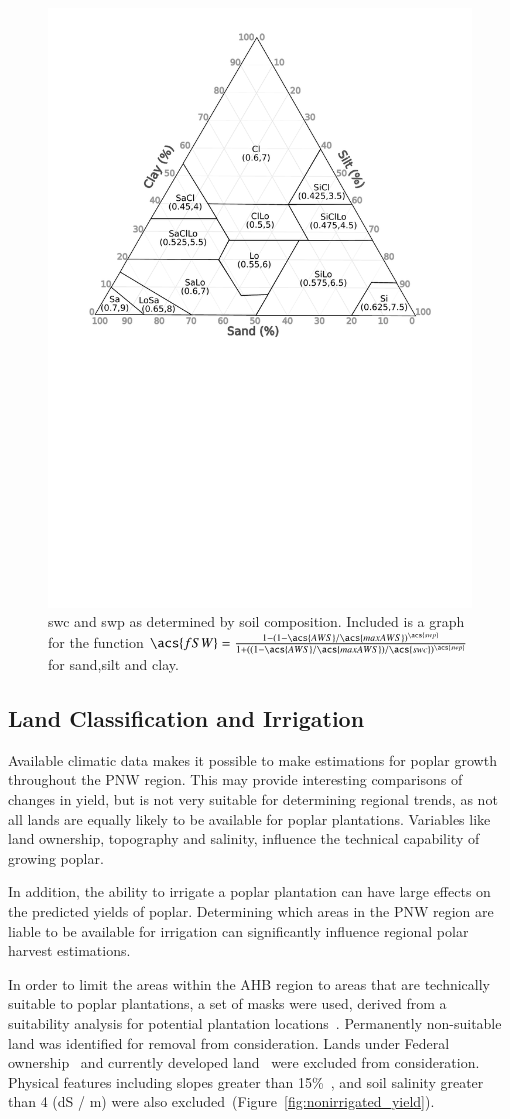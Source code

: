 \documentclass[preprint,12pt]{elsarticle}
\begin{document}
\begin{figure}
  \centering
  \includegraphics[width=0.45\linewidth]{soil_triangle}
  
  \caption{\acs{swc} and \acs{swp} as determined by soil composition.  Included is a graph for the function $\acs{fSW} = \frac{1-(1-\acs{AWS}/\acs{maxAWS})^{\acs{swp}}}{1+((1-\acs{AWS}/\acs{maxAWS})/\acs{swc})^{\acs{swp}}}$ for sand,silt and clay. }
  \label{fig:soil-triangle}
\end{figure}

\subsection{Land Classification and Irrigation}
\label{sec:land}

Available climatic data makes it possible to make estimations for
poplar growth throughout the \ac{PNW} region.  This may provide
interesting comparisons of changes in yield, but is not very suitable
for determining regional trends, as not all lands are equally likely
to be available for poplar plantations.  Variables like land
ownership, topography and salinity, influence the technical capability
of growing poplar.  

In addition, the ability to irrigate a poplar plantation can have
large effects on the predicted yields of poplar.  Determining which
areas in the \ac{PNW} region are liable to be available for irrigation
can significantly influence regional polar harvest estimations.  

In order to limit the areas within the \ac{AHB} region to areas that
are technically suitable to poplar plantations, a set of masks were
used, derived from a suitability analysis for potential plantation
locations~\cite{Cooke2014}. Permanently non-suitable land was
identified for removal from consideration. Lands under Federal
ownership~\cite{NationalAtlasoftheUnitedStates2013} and currently
developed land~\cite{nlcd2011} were excluded from consideration.
Physical features including slopes greater than 15\%~\cite{Gesch2007},
and soil salinity greater than 4 (dS / m) were also
excluded~(Figure~\ref{fig:nonirrigated_yield}).
\end{document}
